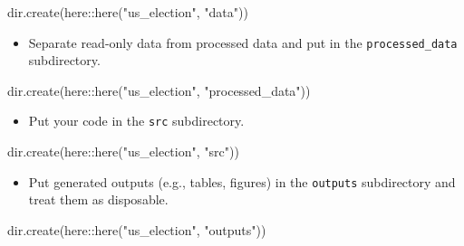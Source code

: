 \documentclass[
]{book}
\newenvironment{Shaded}{\begin{snugshade}}{\end{snugshade}}
\newcommand{\FunctionTok}[1]{\textcolor[rgb]{0.00,0.00,0.00}{#1}}
\newcommand{\NormalTok}[1]{#1}
\newcommand{\SpecialCharTok}[1]{\textcolor[rgb]{0.00,0.00,0.00}{#1}}
\newcommand{\StringTok}[1]{\textcolor[rgb]{0.31,0.60,0.02}{#1}}
\providecommand{\tightlist}{%
  \setlength{\itemsep}{0pt}\setlength{\parskip}{0pt}}
\begin{document}
\begin{Shaded}
\begin{Highlighting}[]
\FunctionTok{dir.create}\NormalTok{(here}\SpecialCharTok{::}\FunctionTok{here}\NormalTok{(}\StringTok{"us\_election"}\NormalTok{, }\StringTok{"data"}\NormalTok{))}
\end{Highlighting}
\end{Shaded}

\begin{itemize}
\tightlist
\item
  Separate read-only data from processed data and put in the \texttt{processed\_data} subdirectory.
\end{itemize}

\begin{Shaded}
\begin{Highlighting}[]
\FunctionTok{dir.create}\NormalTok{(here}\SpecialCharTok{::}\FunctionTok{here}\NormalTok{(}\StringTok{"us\_election"}\NormalTok{, }\StringTok{"processed\_data"}\NormalTok{))}
\end{Highlighting}
\end{Shaded}

\begin{itemize}
\tightlist
\item
  Put your code in the \texttt{src} subdirectory.
\end{itemize}

\begin{Shaded}
\begin{Highlighting}[]
\FunctionTok{dir.create}\NormalTok{(here}\SpecialCharTok{::}\FunctionTok{here}\NormalTok{(}\StringTok{"us\_election"}\NormalTok{, }\StringTok{"src"}\NormalTok{))}
\end{Highlighting}
\end{Shaded}

\begin{itemize}
\tightlist
\item
  Put generated outputs (e.g., tables, figures) in the \texttt{outputs} subdirectory and treat them as disposable.
\end{itemize}

\begin{Shaded}
\begin{Highlighting}[]
\FunctionTok{dir.create}\NormalTok{(here}\SpecialCharTok{::}\FunctionTok{here}\NormalTok{(}\StringTok{"us\_election"}\NormalTok{, }\StringTok{"outputs"}\NormalTok{))}
\end{Highlighting}
\end{Shaded}
\end{document}
